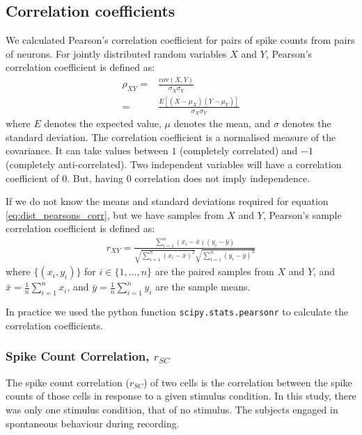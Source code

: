 \documentclass[a4paper,12pt]{article}
\theoremstyle{definition}
\newcommand{\cov}{\text{cov}} %
\begin{document}
    \subsection{Correlation coefficients}
    We calculated Pearson's correlation coefficient for pairs of spike counts from pairs of neurons. For jointly distributed random variables $X$ and $Y$, Pearson's correlation coefficient is defined as:
    \begin{align}\label{eq:dist_pearsons_corr}
        \rho_{XY} =& \frac{\cov(X,Y)}{\sigma_X \sigma_Y} \\
                  =& \frac{E[(X - \mu_X)(Y - \mu_Y)]}{\sigma_X \sigma_Y}
    \end{align}
    where $E$ denotes the expected value, $\mu$ denotes the mean, and $\sigma$ denotes the standard deviation. The correlation coefficient is a normalised measure of the covariance. It can take values between $1$ (completely correlated) and $-1$ (completely anti-correlated). Two independent variables will have a correlation coefficient of $0$. But, having $0$ correlation does not imply independence.

    If we do not know the means and standard deviations required for equation \ref{eq:dist_pearsons_corr}, but we have samples from $X$ and $Y$, Pearson's sample correlation coefficient is defined as:
    \begin{align}
        r_{XY} = \frac{\sum_{i=1}^n (x_i - \bar{x})(y_i - \bar{y})}{\sqrt{\sum_{i=1}^n (x_i - \bar{x})^2}\sqrt{\sum_{i=1}^n (y_i - \bar{y})^2}}
    \end{align}
    where $\lbrace (x_i, y_i) \rbrace$ for $i \in \lbrace 1, \dots, n \rbrace$ are the paired samples from $X$ and $Y$, and $\bar{x} = \frac{1}{n}\sum_{i=1}^n x_i$, and $\bar{y} = \frac{1}{n}\sum_{i=1}^n y_i$ are the sample means.

    In practice we used the python function \texttt{scipy.stats.pearsonr} to calculate the correlation coefficients.

        \subsubsection{Spike Count Correlation, $r_{SC}$}\label{sec:spike_count_correlation}
        The spike count correlation ($r_{SC}$) of two cells is the correlation between the spike counts of those cells in response to a given stimulus condition. In this study, there was only one stimulus condition, that of no stimulus. The subjects engaged in spontaneous behaviour during recording.
\end{document}
